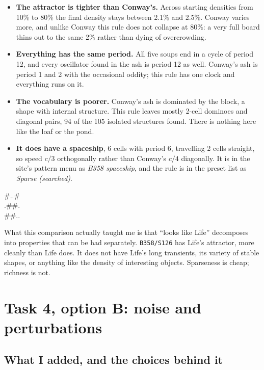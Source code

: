 \documentclass[11pt]{article}
\newcommand{\rulename}[1]{\texttt{#1}}
\begin{document}
\begin{itemize}
  \item \textbf{The attractor is tighter than Conway's.} Across starting densities from 10\% to 80\%
    the final density stays between 2.1\% and 2.5\%. Conway varies more, and unlike Conway this rule
    does not collapse at 80\%: a very full board thins out to the same 2\% rather than dying of
    overcrowding.
  \item \textbf{Everything has the same period.} All five soups end in a cycle of period 12, and
    every oscillator found in the ash is period 12 as well. Conway's ash is period 1 and 2 with the
    occasional oddity; this rule has one clock and everything runs on it.
  \item \textbf{The vocabulary is poorer.} Conway's ash is dominated by the block, a shape with
    internal structure. This rule leaves mostly 2-cell dominoes and diagonal pairs, 94 of the 105
    isolated structures found. There is nothing here like the loaf or the pond.
  \item \textbf{It does have a spaceship}, 6 cells with period 6, travelling 2 cells straight, so
    speed $c/3$ orthogonally rather than Conway's $c/4$ diagonally. It is in the site's pattern menu
    as \emph{B358 spaceship}, and the rule is in the preset list as \emph{Sparse (searched)}.
\end{itemize}

\begin{center}
\ttfamily\small
\#..\#\\
.\#\#.\\
\#\#..
\end{center}

What this comparison actually taught me is that ``looks like Life'' decomposes into properties that
can be had separately. \rulename{B358/S126} has Life's attractor, more cleanly than Life does. It
does not have Life's long transients, its variety of stable shapes, or anything like the density of
interesting objects. Sparseness is cheap; richness is not.


\section{Task 4, option B: noise and perturbations}

\subsection{What I added, and the choices behind it}
\end{document}
